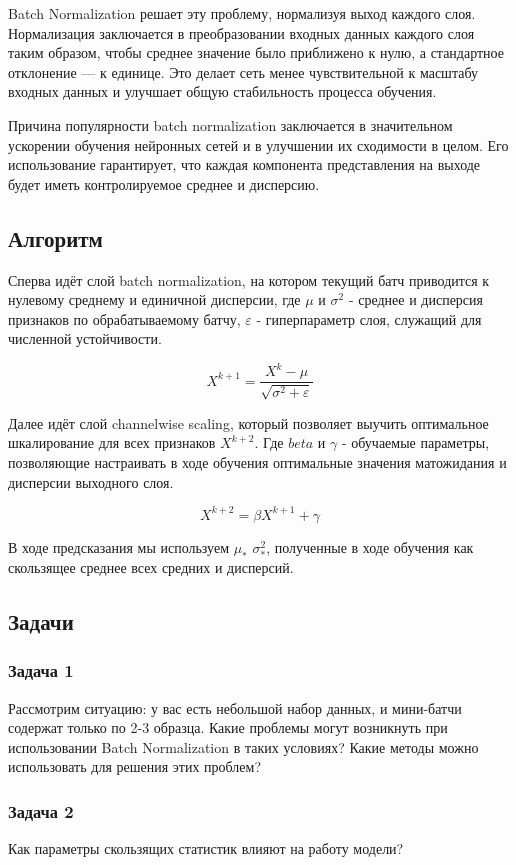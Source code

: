 Batch Normalization решает эту проблему, нормализуя выход каждого слоя. Нормализация заключается в преобразовании входных данных каждого слоя таким образом, чтобы среднее значение было приближено к нулю, а стандартное отклонение — к единице. Это делает сеть менее чувствительной к масштабу входных данных и улучшает общую стабильность процесса обучения.

Причина популярности batch normalization заключается в значительном ускорении обучения нейронных сетей и в улучшении их сходимости в целом. Его использование гарантирует, что каждая компонента представления на выходе будет иметь контролируемое среднее и дисперсию.

\subsection{Алгоритм}
Сперва идёт слой batch normalization, на котором текущий батч приводится к нулевому среднему и единичной дисперсии, где $\mu$ и $\sigma^2$ - среднее и дисперсия признаков по обрабатываемому батчу, $\varepsilon$ - гиперпараметр слоя, служащий для численной устойчивости.

\[X^{k+1} = \frac{X^k - \mu}{\sqrt{\sigma^2 + \varepsilon}}\]

Далее идёт слой channelwise scaling, который позволяет выучить оптимальное шкалирование для всех признаков $X^{k+2}$. Где $beta$ и $\gamma$ - обучаемые параметры, позволяющие настраивать в ходе обучения оптимальные значения матожидания и дисперсии выходного слоя.

\[X^{k+2} = \beta X^{k+1} + \gamma \]

В ходе предсказания мы используем $\mu_*$ $\sigma_*^2$, полученные в ходе обучения как скользящее среднее всех средних и дисперсий. 

\subsection{Задачи}

\subsubsection*{Задача 1}
Рассмотрим ситуацию: у вас есть небольшой набор данных, и мини-батчи содержат только по 2-3 образца. Какие проблемы могут возникнуть при использовании Batch Normalization в таких условиях? Какие методы можно использовать для решения этих проблем?

\subsubsection*{Задача 2}
Как параметры скользящих статистик влияют на работу модели?

